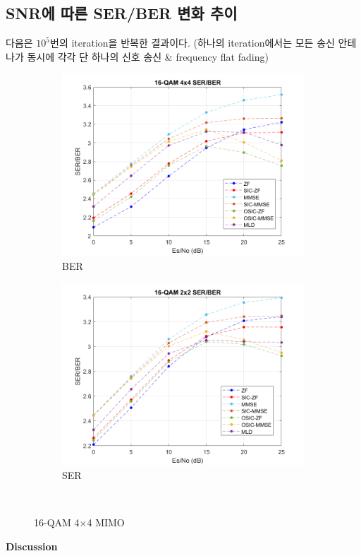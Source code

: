 \documentclass{article}
\newcommand{\bd}{\textbf} %
\begin{document}
\subsection{SNR에 따른 SER/BER 변화 추이}
다음은 $10^5$번의 iteration을 반복한 결과이다. (하나의 iteration에서는 모든 송신 안테나가 동시에 각각 단 하나의 신호 송신 \& frequency flat fading)
\begin{figure}[H]
	\centering
	\begin{subfigure}{0.5\textwidth}
		\centerline{\includegraphics[width=1\textwidth]{ser_div_ber.png}}
		\caption{BER}
	\end{subfigure}%
	\begin{subfigure}{0.5\textwidth}
		\centerline{\includegraphics[width=1\textwidth]{ser_div_ber_2.png}}
		\caption{SER}
	\end{subfigure}\\%
	\caption{16-QAM 4$\times$4 MIMO}
\end{figure}
\noindent
\bd{Discussion}
\end{document}
